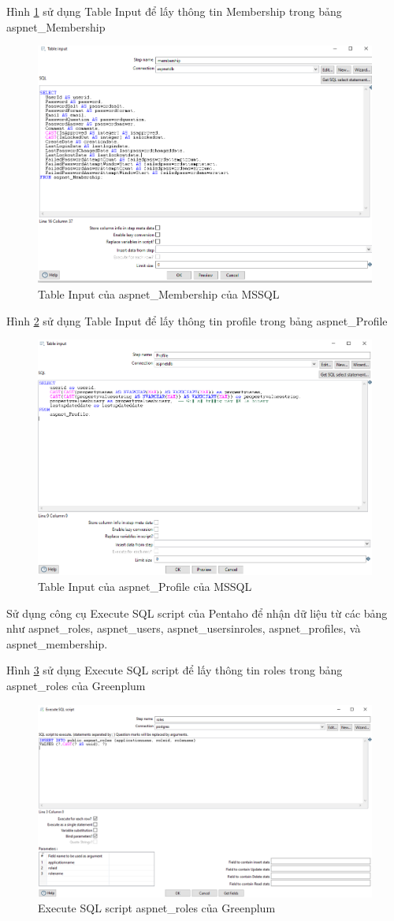 \documentclass[14pt]{article}
\begin{document}
Hình \ref{fig:Membership} sử dụng Table Input để lấy thông tin Membership trong bảng aspnet\_Membership

\begin{figure}
    \centering
    \includegraphics[width=0.5\linewidth]{images/Membership.png}
    \caption{Table Input của aspnet\_Membership của MSSQL}
    \label{fig:Membership}
\end{figure}

Hình \ref{fig:Profile} sử dụng Table Input để lấy thông tin profile trong bảng aspnet\_Profile

\begin{figure}
    \centering
    \includegraphics[width=0.5\linewidth]{images/Profile.png}
   \caption{Table Input của aspnet\_Profile của MSSQL}
    \label{fig:Profile}
\end{figure}



Sử dụng công cụ Execute SQL script của Pentaho để nhận dữ liệu từ các bảng như aspnet\_roles, aspnet\_users, aspnet\_usersinroles, aspnet\_profiles, và aspnet\_membership.

Hình \ref{fig:groles} sử dụng Execute SQL script để lấy thông tin roles trong bảng aspnet\_roles của Greenplum


\begin{figure}
    \centering
    \includegraphics[width=0.5\linewidth]{images/groles.png}
     \caption{Execute SQL script aspnet\_roles của Greenplum}
    \label{fig:groles}
\end{figure}
\end{document}
